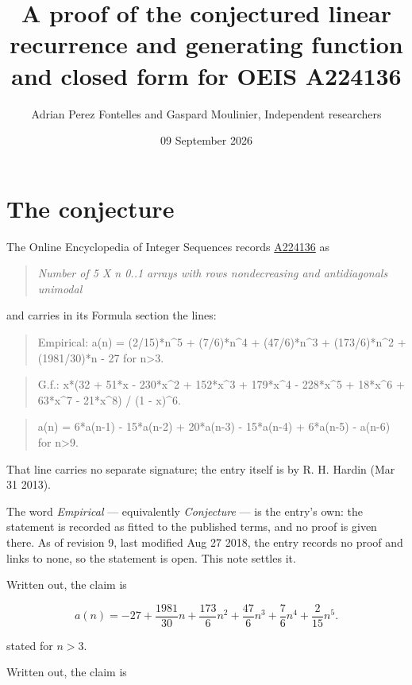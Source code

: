 \documentclass[11pt]{article}
\title{A proof of the conjectured linear recurrence and generating function and closed form for OEIS A224136}
\author{Adrian Perez Fontelles and Gaspard Moulinier, Independent researchers}
\date{09 September 2026}
\theoremstyle{definition}
\begin{document}
\maketitle
\section{The conjecture}

The Online Encyclopedia of Integer Sequences records \href{https://oeis.org/A224136}{A224136} as

\begin{quote}\itshape Number of 5 X n 0..1 arrays with rows nondecreasing and antidiagonals unimodal\end{quote}

and carries in its Formula section the lines:

\begin{quote}\ttfamily Empirical: a(n) = (2/15)*n\textasciicircum{}5 + (7/6)*n\textasciicircum{}4 + (47/6)*n\textasciicircum{}3 + (173/6)*n\textasciicircum{}2 + (1981/30)*n - 27 for n>3.\end{quote}

\begin{quote}\ttfamily G.f.: x*(32 + 51*x - 230*x\textasciicircum{}2 + 152*x\textasciicircum{}3 + 179*x\textasciicircum{}4 - 228*x\textasciicircum{}5 + 18*x\textasciicircum{}6 + 63*x\textasciicircum{}7 - 21*x\textasciicircum{}8) / (1 - x)\textasciicircum{}6.\end{quote}

\begin{quote}\ttfamily a(n) = 6*a(n-1) - 15*a(n-2) + 20*a(n-3) - 15*a(n-4) + 6*a(n-5) - a(n-6) for n>9.\end{quote}

That line carries no separate signature; the entry itself is by R. H. Hardin (Mar 31 2013).

The word {\itshape Empirical} --- equivalently {\itshape Conjecture} --- is the entry's own: the statement is recorded as fitted to the published terms, and no proof is given there. As of revision 9, last modified Aug 27 2018, the entry records no proof and links to none, so the statement is open. This note settles it.

Written out, the claim is

\[a(n) = -27 + \frac{1981}{30}n + \frac{173}{6}n^{2} + \frac{47}{6}n^{3} + \frac{7}{6}n^{4} + \frac{2}{15}n^{5}.\]

stated for $n > 3$.

Written out, the claim is
\end{document}
